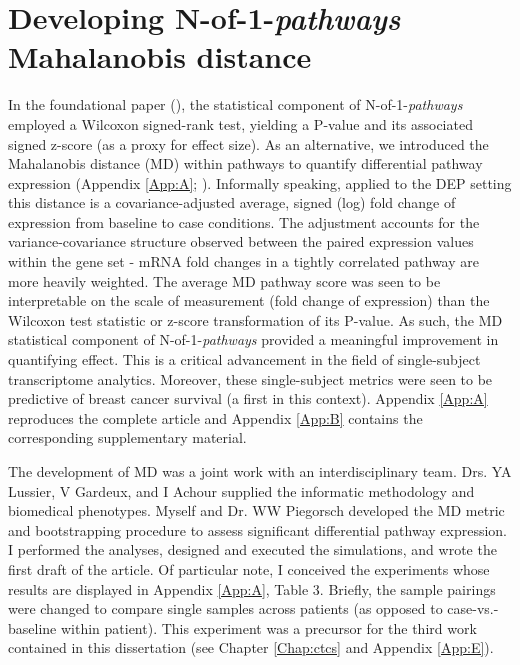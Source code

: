 \chapter{Developing N-of-1-\emph{pathways} \\Mahalanobis distance} \label{Chap:md}

\indent \indent In the foundational paper (\cite{Gardeux2014}), the statistical component of N-of-1-\emph{pathways} employed a Wilcoxon signed-rank test, yielding a P-value and its associated signed z-score (as a proxy for effect size). As an alternative, we introduced the Mahalanobis distance (MD) within pathways to quantify differential pathway expression (Appendix \ref{App:A}; \cite{Schissler2015}). Informally speaking, applied to the DEP setting this distance is a covariance-adjusted average, signed (log) fold change of expression from baseline to case conditions. The adjustment accounts for the variance-covariance structure observed between the paired expression values within the gene set - mRNA fold changes in a tightly correlated pathway are more heavily weighted. The average MD pathway score was seen to be interpretable on the scale of measurement (fold change of expression) than the Wilcoxon test statistic or z-score transformation of its P-value. As such, the MD statistical component of N-of-1-\emph{pathways} provided a meaningful improvement in quantifying effect. This is a critical advancement in the field of single-subject transcriptome analytics. Moreover, these single-subject metrics were seen to be predictive of breast cancer survival (a first in this context). Appendix \ref{App:A} reproduces the complete \cite{Schissler2015} article and Appendix \ref{App:B} contains the corresponding supplementary material.

The development of MD was a joint work with an interdisciplinary team. Drs. YA Lussier, V Gardeux, and I Achour supplied the informatic methodology and biomedical phenotypes. Myself and Dr. WW Piegorsch developed the MD metric and bootstrapping procedure to assess significant differential pathway expression. I performed the analyses, designed and executed the simulations, and wrote the first draft of the article. Of particular note, I conceived the experiments whose results are displayed in Appendix \ref{App:A}, Table 3. Briefly, the sample pairings were changed to compare single samples across patients (as opposed to case-vs.-baseline within patient). This experiment was a precursor for the third work contained in this dissertation (see Chapter \ref{Chap:ctcs} and Appendix \ref{App:E}). 
